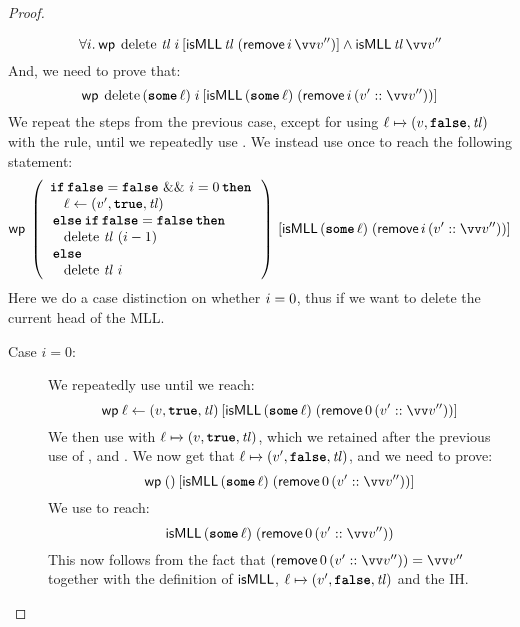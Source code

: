 \documentclass[thesis.tex]{subfiles}
\begin{document}
\begin{proof}
\begin{description}
      \[\All \iindex. \wpre{\MLLdelete\, \langv{tl}\; \iindex}{\isMLL\, \langv{tl}\; (\textlog{remove}\, \iindex\, \vect{\val}'')} \land \isMLL\, \langv{tl}\, \vect{\val}''\]
      And, we need to prove that:
      \[\wpre{\MLLdelete\, (\Some \loc)\; \iindex}{\isMLL\, (\Some \loc)\; (\textlog{remove}\, \iindex\, (\val' :: \vect{\val}''))}\]
      We repeat the steps from the previous case, except for using $\loc \fmapsto (\val, \False, \langv{tl})$ with the  rule, until we repeatedly use . We instead use  once to reach the following statement:
      \[
        \wpre{\left(
          \begin{array}{l}
              \If \False = \False\ \&\&\ \iindex = 0 then \\
              \quad \loc \gets (\val', \True, \langv{tl}) \\
              \Else \If \False = \False then              \\
              \quad \MLLdelete\,\langv{tl}\ (\iindex - 1) \\
              \Else                                       \\
              \quad \MLLdelete\,\langv{tl}\ \iindex
            \end{array}
          \right)}{\isMLL\, (\Some \loc)\; (\textlog{remove}\, \iindex\, (\val' :: \vect{\val}''))}
      \]
      Here we do a case distinction on whether $i = 0$, thus if we want to delete the current head of the MLL.
      \begin{description}
        \item[Case $i = 0$:] We repeatedly use  until we reach:
          \[
            \wpre{\loc \gets (\val, \True, \langv{tl})}{\isMLL\, (\Some \loc)\; (\textlog{remove}\, 0\, (\val' :: \vect{\val}''))}
          \]
          We then use  with $\loc \fmapsto (\val, \True, \langv{tl})$, which we retained after the previous use of , and . We now get that $\loc \fmapsto (\val', \False, \langv{tl})$, and we need to prove:
          \[
            \wpre{()}{\isMLL\, (\Some \loc)\; (\textlog{remove}\, 0\, (\val' :: \vect{\val}''))}
          \]
          We use  to reach:
          \[
            \isMLL\, (\Some \loc)\; (\textlog{remove}\, 0\, (\val' :: \vect{\val}''))
          \]
          This now follows from the fact that $(\textlog{remove}\, 0\, (\val' :: \vect{\val}'')) = \vect{\val}''$ together with the definition of $\textsf{\upshape isMLL}$, $\loc \fmapsto (\val', \False, \langv{tl})$ and the IH.

\end{description}
\end{description}
\end{proof}
\end{document}
